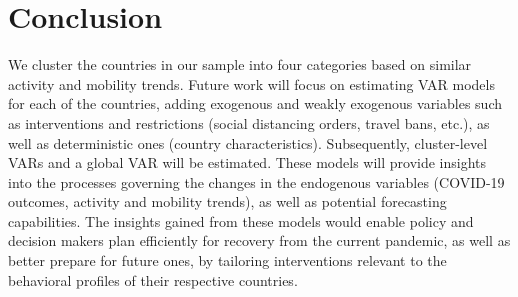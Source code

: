 \documentclass[titlepage,oneside,12pt]{article}
\newcommand{\?}{\stackrel{?}{=}}
\begin{document}
\section{Conclusion}
We cluster the countries in our sample into four categories based on similar activity and mobility trends.
Future work will focus on estimating VAR models for each of the countries, adding exogenous and weakly exogenous variables such as interventions and restrictions (social distancing orders, travel bans, etc.), as well as deterministic ones (country characteristics).
Subsequently, cluster-level VARs and a global VAR will be estimated.
These models will provide insights into the processes governing the changes in the endogenous variables (COVID-19 outcomes, activity and mobility trends), as well as potential forecasting capabilities.
The insights gained from these models would enable policy and decision makers plan efficiently for recovery from the current pandemic, as well as better prepare for future ones, by tailoring interventions relevant to the behavioral profiles of their respective countries.
 




\end{document}
